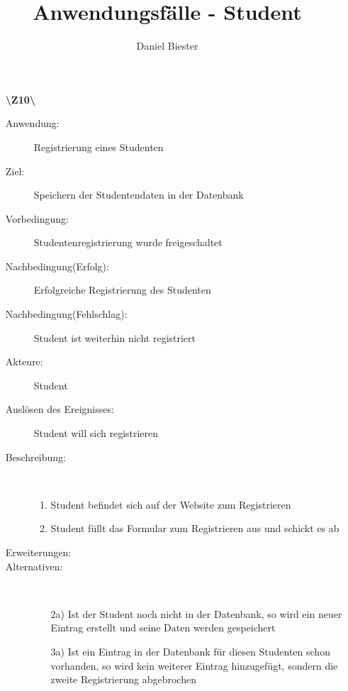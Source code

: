 \documentclass[a4paper]{article}
\begin{document}
\author{Daniel Biester}
\title{\large Anwendungsfälle - Student}
\maketitle

\begin{enumerate}%
  
  \item[\textbf{\textbackslash Z10\textbackslash}] \begin{description}
  	\item[Anwendung:] Registrierung eines Studenten
  	\item[Ziel:] Speichern der Studentendaten in der Datenbank
  	\item[Vorbedingung:] Studentenregistrierung wurde freigeschaltet
  	\item[Nachbedingung(Erfolg):] Erfolgreiche Registrierung des Studenten
  	\item[Nachbedingung(Fehlschlag):] Student ist weiterhin nicht registriert
  	\item[Akteure:] Student
  	\item[Auslösen des Ereignisses:] Student will sich registrieren
  	\item[Beschreibung:]~
  	\begin{enumerate}[1.]
  	  \item Student befindet sich auf der Website zum Registrieren
  	  \item Student füllt das Formular zum Registrieren aus und schickt es ab
  	\end{enumerate}
  	\item[Erweiterungen:]
  	\item[Alternativen:]~
  	\begin{enumerate}
  	  \item[2a)] Ist der Student noch nicht in der Datenbank, so wird ein neuer Eintrag erstellt und seine Daten werden gespeichert
  	  \item[3a)] Ist ein Eintrag in der Datenbank für diesen Studenten schon vorhanden, so wird kein weiterer Eintrag hinzugefügt, sondern die zweite Registrierung abgebrochen
  	\end{enumerate} 
  \end{description}
  \pagebreak
  

\end{enumerate}
\end{document}
